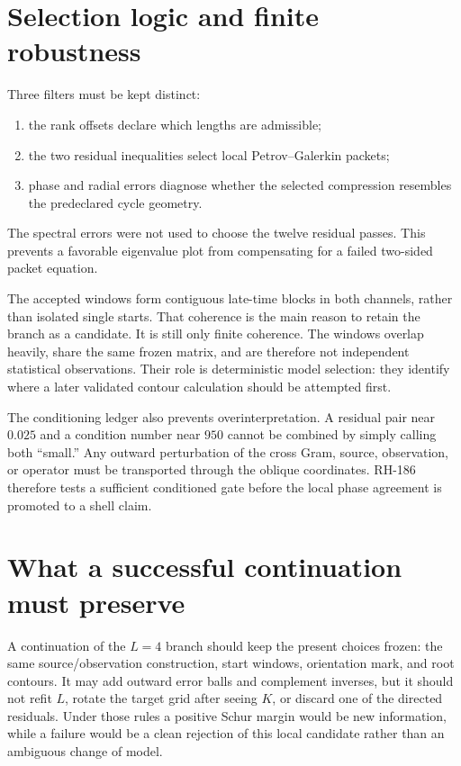 \documentclass[12pt]{article}
\theoremstyle{remark}
\begin{document}
\section{Selection logic and finite robustness}

Three filters must be kept distinct:
\begin{enumerate}[leftmargin=2em]
\item the rank offsets declare which lengths are admissible;
\item the two residual inequalities select local Petrov--Galerkin packets;
\item phase and radial errors diagnose whether the selected compression
 resembles the predeclared cycle geometry.
\end{enumerate}
The spectral errors were not used to choose the twelve residual passes.
This prevents a favorable eigenvalue plot from compensating for a failed
two-sided packet equation.

The accepted windows form contiguous late-time blocks in both channels,
rather than isolated single starts.  That coherence is the main reason to
retain the branch as a candidate.  It is still only finite coherence.  The
windows overlap heavily, share the same frozen matrix, and are therefore not
independent statistical observations.  Their role is deterministic model
selection: they identify where a later validated contour calculation should
be attempted first.

The conditioning ledger also prevents overinterpretation.  A residual pair
near $0.025$ and a condition number near $950$ cannot be combined by simply
calling both ``small.''  Any outward perturbation of the cross Gram, source,
observation, or operator must be transported through the oblique
coordinates.  RH-186 therefore tests a sufficient conditioned gate before
the local phase agreement is promoted to a shell claim.

\section{What a successful continuation must preserve}

A continuation of the $L=4$ branch should keep the present choices frozen:
the same source/observation construction, start windows, orientation mark,
and root contours.  It may add outward error balls and complement inverses,
but it should not refit $L$, rotate the target grid after seeing $K$, or
discard one of the directed residuals.  Under those rules a positive Schur
margin would be new information, while a failure would be a clean rejection
of this local candidate rather than an ambiguous change of model.
\end{document}
